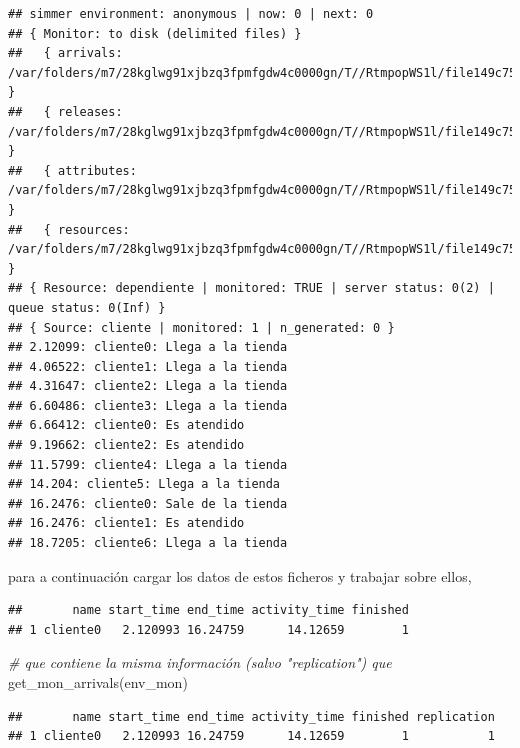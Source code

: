 \documentclass[
]{book}
\newenvironment{Shaded}{\begin{snugshade}}{\end{snugshade}}
\newcommand{\CommentTok}[1]{\textcolor[rgb]{0.56,0.35,0.01}{\textit{#1}}}
\newcommand{\FunctionTok}[1]{\textcolor[rgb]{0.00,0.00,0.00}{#1}}
\newcommand{\NormalTok}[1]{#1}
\newcommand{\OtherTok}[1]{\textcolor[rgb]{0.56,0.35,0.01}{#1}}
\newcommand{\SpecialCharTok}[1]{\textcolor[rgb]{0.00,0.00,0.00}{#1}}
\theoremstyle{definition}
\theoremstyle{definition}
\theoremstyle{definition}
\theoremstyle{definition}
\theoremstyle{remark}
\begin{document}
\begin{verbatim}
## simmer environment: anonymous | now: 0 | next: 0
## { Monitor: to disk (delimited files) }
##   { arrivals: /var/folders/m7/28kglwg91xjbzq3fpmfgdw4c0000gn/T//RtmpopWS1l/file149c75dc6a077_arrivals.csv }
##   { releases: /var/folders/m7/28kglwg91xjbzq3fpmfgdw4c0000gn/T//RtmpopWS1l/file149c75dc6a077_releases.csv }
##   { attributes: /var/folders/m7/28kglwg91xjbzq3fpmfgdw4c0000gn/T//RtmpopWS1l/file149c75dc6a077_attributes.csv }
##   { resources: /var/folders/m7/28kglwg91xjbzq3fpmfgdw4c0000gn/T//RtmpopWS1l/file149c75dc6a077_resources.csv }
## { Resource: dependiente | monitored: TRUE | server status: 0(2) | queue status: 0(Inf) }
## { Source: cliente | monitored: 1 | n_generated: 0 }
## 2.12099: cliente0: Llega a la tienda
## 4.06522: cliente1: Llega a la tienda
## 4.31647: cliente2: Llega a la tienda
## 6.60486: cliente3: Llega a la tienda
## 6.66412: cliente0: Es atendido
## 9.19662: cliente2: Es atendido
## 11.5799: cliente4: Llega a la tienda
## 14.204: cliente5: Llega a la tienda
## 16.2476: cliente0: Sale de la tienda
## 16.2476: cliente1: Es atendido
## 18.7205: cliente6: Llega a la tienda
\end{verbatim}

para a continuación cargar los datos de estos ficheros y trabajar sobre ellos,

\begin{Shaded}
\end{Shaded}

\begin{verbatim}
##       name start_time end_time activity_time finished
## 1 cliente0   2.120993 16.24759      14.12659        1
\end{verbatim}

\begin{Shaded}
\begin{Highlighting}[]
\CommentTok{\# que contiene la misma información (salvo "replication") que}
\FunctionTok{get\_mon\_arrivals}\NormalTok{(env\_mon)}
\end{Highlighting}
\end{Shaded}

\begin{verbatim}
##       name start_time end_time activity_time finished replication
## 1 cliente0   2.120993 16.24759      14.12659        1           1
\end{verbatim}
\end{document}
